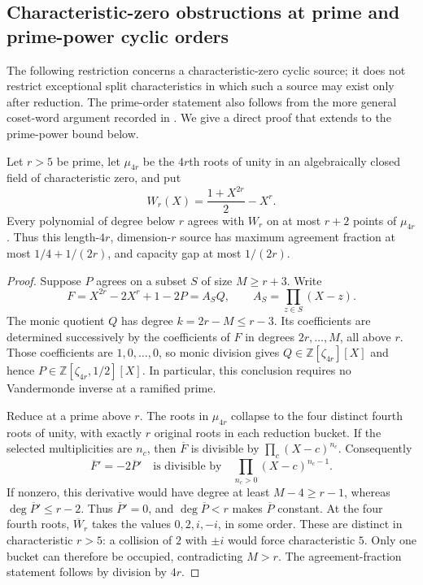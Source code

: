 \subsection{Characteristic-zero obstructions at prime and prime-power cyclic orders}
\label{sec:ordinary-ca-prime-order-obstruction}

The following restriction concerns a characteristic-zero cyclic source;
it does not restrict exceptional split characteristics in which such a
source may exist only after reduction.
The prime-order statement also follows from the more general coset-word
argument recorded in
.
We give a direct proof that extends to the prime-power bound below.

\begin{proposition}\label{prop:ordinary-ca-prime-order-obstruction}
Let $r>5$ be prime, let $\mu_{4r}$ be the $4r$th roots of unity in an
algebraically closed field of characteristic zero, and put
\[
 W_r(X)=\frac{1+X^{2r}}2-X^r.
\]
Every polynomial of degree below $r$ agrees with $W_r$ on at most $r+2$
points of $\mu_{4r}$. Thus this length-$4r$, dimension-$r$ source has
maximum agreement fraction at most
$1/4+1/(2r)$, and capacity gap at most $1/(2r)$.
\end{proposition}
\begin{proof}
Suppose $P$ agrees on a subset $S$ of size $M\ge r+3$. Write
\[
 F=X^{2r}-2X^r+1-2P=A_S Q,
 \qquad A_S=\prod_{z\in S}(X-z).
\]
The monic quotient $Q$ has degree $k=2r-M\le r-3$.
Its coefficients are determined successively by the coefficients of
$F$ in degrees $2r,\ldots,M$, all above $r$. Those coefficients are
$1,0,\ldots,0$, so monic division gives
$Q\in\mathbb Z[\zeta_{4r}][X]$ and hence
$P\in\mathbb Z[\zeta_{4r},1/2][X]$.
In particular, this conclusion requires no Vandermonde inverse at a
ramified prime.

Reduce at a prime above $r$. The roots in $\mu_{4r}$ collapse to the
four distinct fourth roots of unity, with exactly $r$ original roots
in each reduction bucket. If the selected multiplicities are $n_c$,
then $\overline F$ is divisible by
$\prod_c(X-c)^{n_c}$. Consequently
\[
 \overline F'=-2\overline P'
 \quad\text{is divisible by}\quad
 \prod_{n_c>0}(X-c)^{n_c-1}.
\]
If nonzero, this derivative would have degree at least $M-4\ge r-1$,
whereas $\deg\overline P'\le r-2$. Thus $\overline P'=0$, and
$\deg\overline P<r$ makes $\overline P$ constant.
At the four fourth roots, $\overline W_r$ takes the values
$0,2,i,-i$, in some order. These are distinct in characteristic $r>5$:
a collision of $2$ with $\pm i$ would force characteristic $5$.
Only one bucket can therefore be occupied, contradicting $M>r$.
The agreement-fraction statement follows by division by $4r$.
\end{proof}

